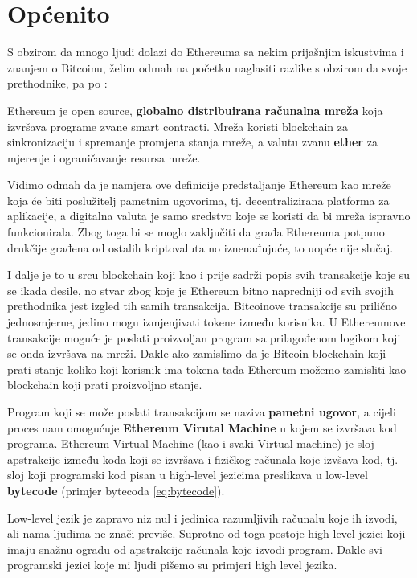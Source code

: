 \documentclass[a4paper,oneside,12pt]{memoir} %
\begin{document}
\section{Općenito}

S obzirom da mnogo ljudi dolazi do Ethereuma sa nekim prijašnjim iskustvima i znanjem o Bitcoinu, želim odmah na početku naglasiti razlike s obzirom da svoje prethodnike, pa po \cite{ethbook}:

\begin{definicija}
Ethereum je open source, \textbf{globalno distribuirana računalna mreža} koja izvršava programe zvane smart contracti. Mreža koristi blockchain za sinkronizaciju i spremanje promjena stanja mreže, a valutu zvanu \textbf{ether} za mjerenje i ograničavanje resursa mreže.
\end{definicija}

Vidimo odmah da je namjera ove definicije predstaljanje Ethereum kao mreže koja će biti poslužitelj pametnim ugovorima, tj. decentralizirana platforma za aplikacije, a digitalna valuta je samo sredstvo koje se koristi da bi mreža ispravno funkcionirala. Zbog toga bi se moglo zaključiti da građa Ethereuma potpuno drukčije građena od ostalih kriptovaluta no iznenađujuće, to uopće nije slučaj.

I dalje je to u srcu blockchain koji kao i prije sadrži popis svih transakcije koje su se ikada desile, no stvar zbog koje je Ethereum bitno napredniji od svih svojih prethodnika jest izgled tih samih transakcija. Bitcoinove transakcije su prilično jednosmjerne, jedino mogu izmjenjivati tokene između korisnika. U Ethereumove transakcije moguće je poslati proizvoljan program sa prilagođenom logikom koji se onda izvršava na mreži. Dakle ako zamislimo da je Bitcoin blockchain koji prati stanje koliko koji korisnik ima tokena tada Ethereum možemo zamisliti kao blockchain koji prati proizvoljno stanje.

Program koji se može poslati transakcijom se naziva \textbf{pametni ugovor}, a cijeli proces nam omogućuje \textbf{Ethereum Virutal Machine} u kojem se izvršava kod programa. Ethereum Virtual Machine (kao i svaki Virtual machine) je sloj apstrakcije između koda koji se izvršava i fizičkog računala koje izvšava kod, tj. sloj koji programski kod pisan u high-level jezicima preslikava u low-level \textbf{bytecode} (primjer bytecoda \ref{eq:bytecode}).

\begin{napomena}
Low-level jezik je zapravo niz nul i jedinica razumljivih računalu koje ih izvodi, ali nama ljudima ne znači previše. Suprotno od toga postoje high-level jezici koji imaju snažnu ogradu od apstrakcije računala koje izvodi program. Dakle svi programski jezici koje mi ljudi pišemo su primjeri high level jezika.
\end{napomena}
\end{document}
